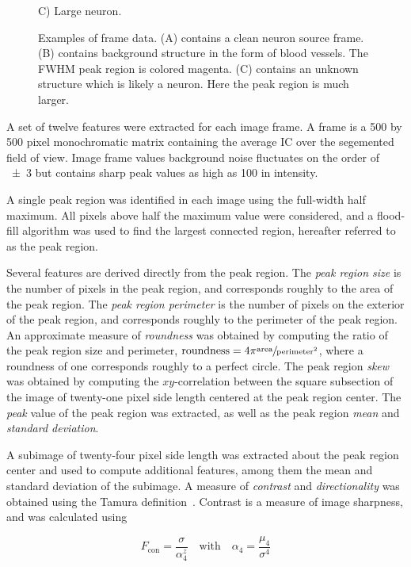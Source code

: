 \documentclass[10pt]{article}
\begin{document}
\begin{figure}[h]
\begin{minipage}{.33\textwidth}
      \caption*{\footnotesize C) Large neuron. }
      \label{fig:frame3}
    \end{minipage}
    \caption{\footnotesize Examples of frame data. (A) contains a clean neuron source frame. (B) contains background structure in the form of blood vessels. The FWHM peak region is colored magenta. (C) contains an unknown structure which is likely a neuron. Here the peak region is much larger. }
\end{figure}

A set of twelve features were extracted for each image frame.
A frame is a \num{500} by \num{500} pixel monochromatic matrix containing the average IC over the segemented field of view. 
Image frame values background noise fluctuates on the order of \num{+-3} but contains sharp peak values as high as \num{100} in intensity.

A single peak region was identified in each image using the full-width half maximum.
All pixels above half the maximum value were considered, and a flood-fill algorithm was used to find the largest connected region, hereafter referred to as the peak region.

Several features are derived directly from the peak region.
The \emph{peak region size} is the number of pixels in the peak region, and corresponds roughly to the area of the peak region.
The \emph{peak region perimeter} is the number of pixels on the exterior of the peak region, and corresponds roughly to the perimeter of the peak region.
An approximate measure of \emph{roundness} was obtained by computing the ratio of the peak region size and perimeter, $\text{roundness} = 4\pi \sfrac{\text{area}}{\text{perimeter}^2}$, 
where a roundness of one corresponds roughly to a perfect circle.
The peak region \emph{skew} was obtained by computing the $xy$-correlation between the square subsection of the image of twenty-one pixel side length centered at the peak region center.
The \emph{peak} value of the peak region was extracted, as well as the peak region \emph{mean} and \emph{standard deviation}.

A subimage of twenty-four pixel side length was extracted about the peak region center and used to compute additional features, among them the mean and standard deviation of the subimage.
A measure of \emph{contrast} and \emph{directionality} was obtained using the Tamura definition~\cite{Tamura1978}.
Contrast is a measure of image sharpness, and was calculated using

$$
F_\text{con} = \frac{\sigma}{\alpha_4^z} \quad \text{with} \quad \alpha_4 = \frac{\mu_4}{\sigma^4}
$$
\end{document}

